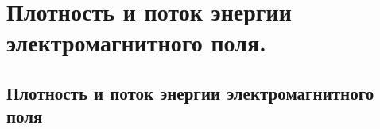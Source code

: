 \chapter{Плотность и поток энергии электромагнитного поля.}

\section{Плотность и поток энергии электромагнитного поля}
